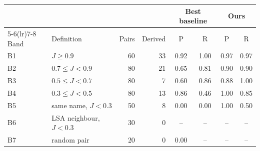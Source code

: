 \begin{tabular}{llrrcccc}
\toprule
 & & & & \multicolumn{2}{c}{Best baseline} & \multicolumn{2}{c}{Ours} \\
\cmidrule(lr){5-6}\cmidrule(lr){7-8}
Band & Definition & Pairs & Derived & P & R & P & R \\
\midrule
B1 & $J \geq 0.9$ & 60 & 33 & 0.92 & 1.00 & 0.97 & 0.97 \\
B2 & $0.7 \leq J < 0.9$ & 80 & 21 & 0.65 & 0.81 & 0.90 & 0.90 \\
B3 & $0.5 \leq J < 0.7$ & 80 & 7 & 0.60 & 0.86 & 0.88 & 1.00 \\
B4 & $0.3 \leq J < 0.5$ & 80 & 13 & 0.86 & 0.46 & 1.00 & 0.85 \\
B5 & same name, $J<0.3$ & 50 & 8 & 0.00 & 0.00 & 1.00 & 0.50 \\
B6 & LSA neighbour, $J<0.3$ & 30 & 0 & -- & -- & -- & -- \\
B7 & random pair & 20 & 0 & 0.00 & -- & -- & -- \\
\bottomrule
\end{tabular}

